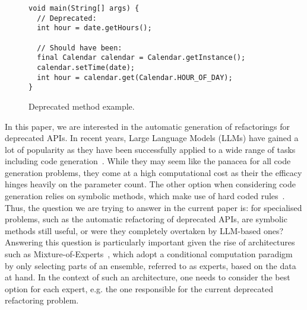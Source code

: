 \documentclass[sigconf,review,anonymous]{acmart}
\begin{document}
\begin{figure}[H]
\begin{lstlisting}[mathescape=true,showstringspaces=false]
void main(String[] args) {
  // Deprecated:
  int hour = date.getHours();
  
  // Should have been:
  final Calendar calendar = Calendar.getInstance();
  calendar.setTime(date);
  int hour = calendar.get(Calendar.HOUR_OF_DAY);
}
\end{lstlisting}
\caption{Deprecated method example.}
\label{ex:deprecated-method-other}
\end{figure}



In this paper, we are interested in the automatic generation of refactorings for deprecated APIs. In recent years, Large Language Models (LLMs) have gained a lot of popularity as they have been successfully applied to a wide range of tasks including code generation~\cite{chen2022codet,llmsforcodecompletion,codegenclasslevel,ni2023lever,zhang2023repocoder,lostintranslation,Ding2024cocomic,yang2024sweagent}. While they may seem like the panacea for all code generation problems, they come at a high computational cost as their  the efficacy hinges heavily on the parameter count. The other option when considering code generation relies on symbolic methods, which make use of hard coded rules~\cite{}. Thus, the question we are trying to answer in the current paper is: for specialised problems, such as the automatic refactoring of deprecated APIs, are symbolic methods still useful, or were they completely overtaken by LLM-based ones? Answering this question is particularly important given the rise of architectures such as  Mixture-of-Experts~\cite{}, which adopt a conditional computation paradigm by only selecting parts of an ensemble, referred to as experts, based on the data at hand. In the context of such an architecture, one needs to consider the best option for each expert, e.g. the one responsible for the current deprecated refactoring problem.
 
\end{document}
